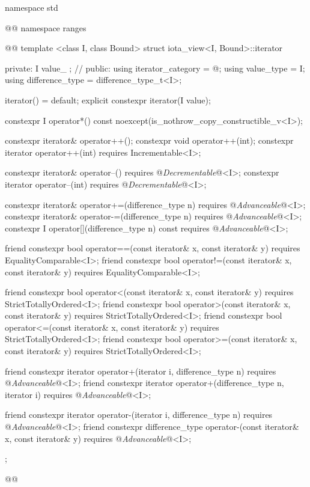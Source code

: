 \begin{codeblock}
namespace std { @@ namespace ranges { @@
  template <class I, class Bound>
  struct iota_view<I, Bound>::iterator {
  private:
    I value_ {}; // \expos
  public:
    using iterator_category = @\seebelow@;
    using value_type = I;
    using difference_type = difference_type_t<I>;

    iterator() = default;
    explicit constexpr iterator(I value);

    constexpr I operator*() const noexcept(is_nothrow_copy_constructible_v<I>);

    constexpr iterator& operator++();
    constexpr void operator++(int);
    constexpr iterator operator++(int) requires Incrementable<I>;

    constexpr iterator& operator--() requires @\textit{Decrementable}@<I>;
    constexpr iterator operator--(int) requires @\textit{Decrementable}@<I>;

    constexpr iterator& operator+=(difference_type n)
      requires @\textit{Advanceable}@<I>;
    constexpr iterator& operator-=(difference_type n)
      requires @\textit{Advanceable}@<I>;
    constexpr I operator[](difference_type n) const
      requires @\textit{Advanceable}@<I>;

    friend constexpr bool operator==(const iterator& x, const iterator& y)
      requires EqualityComparable<I>;
    friend constexpr bool operator!=(const iterator& x, const iterator& y)
      requires EqualityComparable<I>;

    friend constexpr bool operator<(const iterator& x, const iterator& y)
      requires StrictTotallyOrdered<I>;
    friend constexpr bool operator>(const iterator& x, const iterator& y)
      requires StrictTotallyOrdered<I>;
    friend constexpr bool operator<=(const iterator& x, const iterator& y)
      requires StrictTotallyOrdered<I>;
    friend constexpr bool operator>=(const iterator& x, const iterator& y)
      requires StrictTotallyOrdered<I>;

    friend constexpr iterator operator+(iterator i, difference_type n)
      requires @\textit{Advanceable}@<I>;
    friend constexpr iterator operator+(difference_type n, iterator i)
      requires @\textit{Advanceable}@<I>;

    friend constexpr iterator operator-(iterator i, difference_type n)
      requires @\textit{Advanceable}@<I>;
    friend constexpr difference_type operator-(const iterator& x, const iterator& y)
      requires @\textit{Advanceable}@<I>;
  };
}}@\removed{\}\}}@
\end{codeblock}

